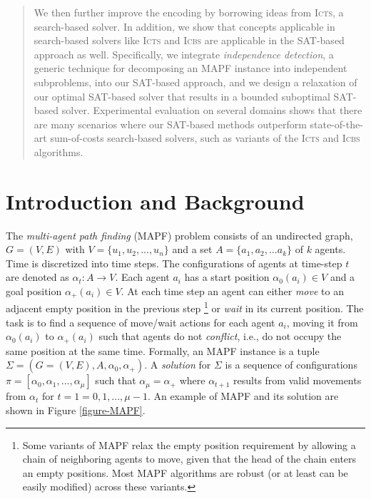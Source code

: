 \documentclass[jair,oneside,11pt]{article}
\begin{document}
\begin{abstract}
We then further improve the encoding by borrowing ideas from \textsc{Icts}, a search-based solver. 
In addition, we show that concepts applicable in search-based solvers like \textsc{Icts} and \textsc{Icbs} are applicable in the SAT-based approach as well. 
Specifically, we integrate {\em independence detection}, a generic technique for decomposing an MAPF instance into independent subproblems, into our SAT-based approach, and we design a relaxation of our optimal SAT-based solver that results in a bounded suboptimal SAT-based solver.
Experimental evaluation on several domains shows that there are many scenarios where our SAT-based methods outperform state-of-the-art sum-of-costs search-based solvers, such as variants of the \textsc{Icts} and \textsc{Icbs} algorithms.
\end{abstract}



\section{Introduction and Background}
\noindent
The {\em multi-agent path finding} (MAPF) problem consists of an undirected graph, $G=(V,E)$ with $V=\{u_1,u_2, ...,u_n\}$
and a set $A=\{a_1, a_2,\dots a_k\}$ of $k$ agents. Time is discretized into
time steps. The configurations of agents at time-step $t$ are denoted as
$\alpha_t: A \rightarrow V$. Each agent $a_i$ has a start position $\alpha_0(a_i) \in V$ and a
goal position $\alpha_+(a_i) \in V$.  At each time step an agent can either
{\em move} to an adjacent empty position in the previous step \footnote{Some variants of MAPF relax
the empty position requirement by allowing a chain of neighboring agents to
move, given that the
head of the chain enters an empty positions.
Most MAPF algorithms are robust (or at least can be easily modified) across these
variants.} or {\em wait} in its current position. The task is to find a
sequence of move/wait actions for each agent $a_i$, moving it from
$\alpha_0(a_i)$ to $\alpha_+(a_i)$ such that agents do not {\em conflict},
i.e., do not occupy the same position at the same time. Formally, an MAPF
instance is a tuple $\Sigma=(G=(V,E),A,\alpha_0,\alpha_+)$. A \textit{solution}
for $\Sigma$ is a sequence of configurations
$\pi=[\alpha_0,\alpha_1,...,\alpha_{\mu}]$ such that
$\alpha_{\mu}=\alpha_+$ where $\alpha_{t+1}$ results from valid movements from
$\alpha_{t}$ for $t=1=0,1,...,\mu-1$. An example of MAPF and its solution are
shown in Figure \ref{figure-MAPF}.
\end{document}
